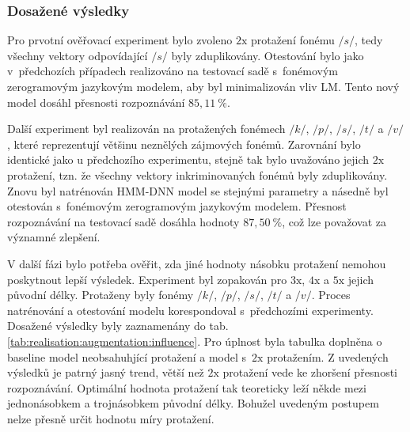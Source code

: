 
\subsubsection{Dosažené výsledky}


Pro prvotní ověřovací experiment bylo zvoleno $2\mathrm{x}$ protažení fonému $/s/$, tedy všechny vektory odpovídající $/s/$ byly zduplikovány.
Otestování bylo jako v~předchozích případech realizováno na testovací sadě s~fonémovým zerogramovým jazykovým modelem, aby byl minimalizován vliv LM.
Tento nový model dosáhl přesnosti rozpoznávání $85,11~\%$.

Další experiment byl realizován na protažených fonémech $/k/$, $/p/$, $/s/$, $/t/$ a $/v/$, které reprezentují většinu neznělých zájmových fonémů.
Zarovnání bylo identické jako u předchozího experimentu, stejně tak bylo uvažováno jejich $2\mathrm{x}$ protažení, tzn. že všechny vektory inkriminovaných fonémů byly zduplikovány.
Znovu byl natrénován HMM-DNN model se stejnými parametry a násedně byl otestován s~fonémovým zerogramovým jazykovým modelem.
Přesnost rozpoznávání na testovací sadě dosáhla hodnoty $87,50~\%$, což lze považovat za významné zlepšení.

V další fázi bylo potřeba ověřit, zda jiné hodnoty násobku protažení nemohou poskytnout lepší výsledek.
Experiment byl zopakován pro $3\mathrm{x}$, $4\mathrm{x}$ a $5\mathrm{x}$ jejich původní délky.
Protaženy byly fonémy $/k/$, $/p/$, $/s/$, $/t/$ a $/v/$.
Proces natrénování a otestování modelu korespondoval s~předchozími experimenty.
Dosažené výsledky byly zaznamenány do tab. \ref{tab:realisation:augmentation:influence}.
Pro úplnost byla tabulka doplněna o baseline model neobsahuhjící protažení a model s~$2\mathrm{x}$ protažením.
Z uvedených výsledků je patrný jasný trend, větší než $2\mathrm{x}$ protažení vede ke zhoršení přesnosti rozpoznávání.
Optimální hodnota protažení tak teoreticky leží někde mezi jednonásobkem a trojnásobkem původní délky.
Bohužel uvedeným postupem nelze přesně určit hodnotu míry protažení.


